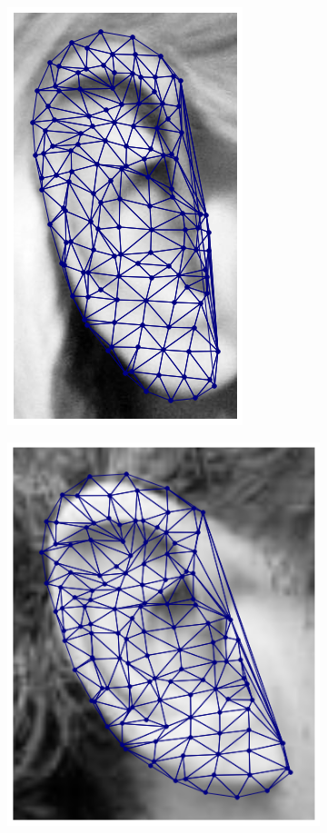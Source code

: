 \begin{figure}[!h]
\begin{subfigure}[b]{0.7\textwidth}
    \end{subfigure}
    \begin{subfigure}[b]{0.7\textwidth}
            \includegraphics[height=1\textwidth]{supports/Fittings/fitting_ear_0010}
    \end{subfigure}
    \begin{subfigure}[b]{0.7\textwidth}
            \includegraphics[height=1\textwidth]{supports/Fittings/fitting_ear_0015}

\end{subfigure}
\end{figure}
